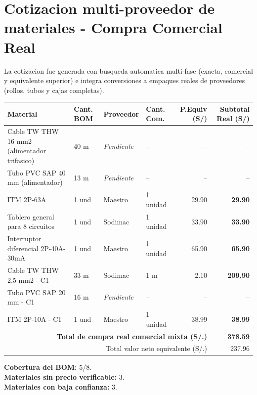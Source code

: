 \section{Cotizacion multi-proveedor de materiales - Compra Comercial Real}

La cotizacion fue generada con busqueda automatica multi-fase (exacta, comercial y equivalente superior) e integra conversiones a empaques reales de proveedores (rollos, tubos y cajas completas).

\begin{longtable}{p{5.0cm} p{1.5cm} p{2.2cm} p{2.2cm} r r}
\toprule
\textbf{Material} & \textbf{Cant. BOM} & \textbf{Proveedor} & \textbf{Cant. Com.} & \textbf{P.Equiv (S/)} & \textbf{Subtotal Real (S/)} \\
\midrule
Cable TW THW 16 mm2 (alimentador trifasico) & 40 m & \textit{Pendiente} & -- & -- & -- \\
Tubo PVC SAP 40 mm (alimentador) & 13 m & \textit{Pendiente} & -- & -- & -- \\
ITM 2P-63A & 1 und & Maestro & 1 unidad & 29.90 & \textbf{29.90} \\
Tablero general para 8 circuitos & 1 und & Sodimac & 1 unidad & 33.90 & \textbf{33.90} \\
Interruptor diferencial 2P-40A-30mA & 1 und & Maestro & 1 unidad & 65.90 & \textbf{65.90} \\
Cable TW THW 2.5 mm2 - C1 & 33 m & Sodimac & 1 m & 2.10 & \textbf{209.90} \\
Tubo PVC SAP 20 mm - C1 & 16 m & \textit{Pendiente} & -- & -- & -- \\
ITM 2P-10A - C1 & 1 und & Maestro & 1 unidad & 38.99 & \textbf{38.99} \\
\midrule
\multicolumn{5}{r}{\textbf{Total de compra real comercial mixta (S/.)}} & \textbf{378.59} \\
\multicolumn{5}{r}{Total valor neto equivalente (S/.)} & 237.96 \\
\bottomrule
\end{longtable}

\noindent\textbf{Cobertura del BOM:} 5/8.\\
\textbf{Materiales sin precio verificable:} 3.\\
\textbf{Materiales con baja confianza:} 3.
